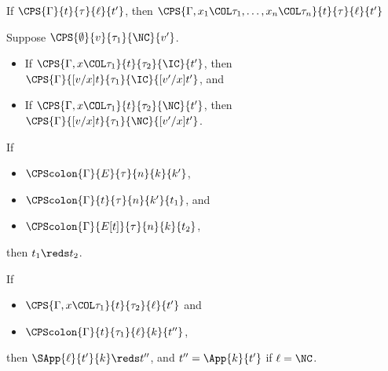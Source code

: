 \begin{lemma}
\label{lem:cps_weak}
If $\CPS{\Gamma}{t}{\tau}{\ell}{t'}$, then $\CPS{\Gamma,x_1\COL\tau_1,\dots,x_n\COL\tau_n}{t}{\tau}{\ell}{t'}$
\end{lemma}


\begin{lemma}
\label{lem:cps_sub}
Suppose $\CPS{\emptyset}{v}{\tau_1}{\NC}{v'}$.
\begin{itemize}
\item If $\CPS{\Gamma, x \COL \tau_1}{t}{\tau_2}{\IC}{t'}$,
      then $\CPS{\Gamma}{[v/x]t}{\tau_1}{\IC}{[v'/x]t'}$, and
\item If $\CPS{\Gamma, x \COL \tau_1}{t}{\tau_2}{\NC}{t'}$,
      then $\CPS{\Gamma}{[v/x]t}{\tau_1}{\NC}{[v'/x]t'}$.
\end{itemize}
\end{lemma}


\begin{lemma}
\label{lem:colon_context}
If
\begin{itemize}
\item $\CPScolon{\Gamma}{E}{\tau}{n}{k}{k'}$,
\item $\CPScolon{\Gamma}{t}{\tau}{n}{k'}{t_1}$, and
\item $\CPScolon{\Gamma}{E[t]}{\tau}{n}{k}{t_2}$,
\end{itemize}
then $t_1 \reds t_2$.
\end{lemma}


\begin{lemma}
\label{lem:init_red}
If
\begin{itemize}
\item $\CPS{\Gamma, x \COL \tau_1}{t}{\tau_2}{\ell}{t'}$ and
\item $\CPScolon{\Gamma}{t}{\tau_1}{\ell}{k}{t''}$,
\end{itemize}
then $\SApp{\ell}{t'}{k} \reds t''$, and $t'' = \App{k}{t'}$ if $\ell = \NC$.
\end{lemma}

